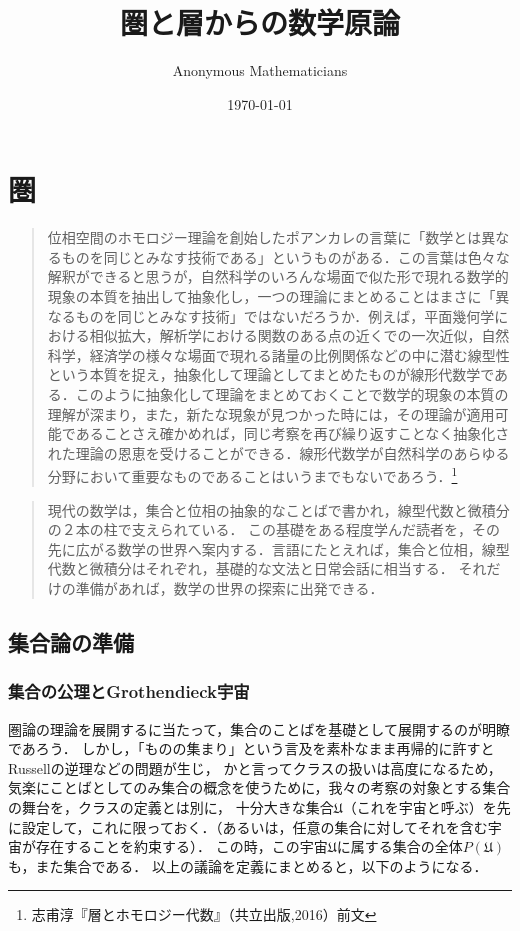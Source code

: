 \documentclass[uplatex, dvipdfmx]{jsreport}
\title{圏と層からの数学原論}
\author{Anonymous Mathematicians}
\date{\today}
\begin{document}
\maketitle
\tableofcontents
\clearpage

\part{圏}

\begin{quotation}
    位相空間のホモロジー理論を創始したポアンカレの言葉に「数学とは異なるものを同じとみなす技術である」というものがある．この言葉は色々な解釈ができると思うが，自然科学のいろんな場面で似た形で現れる数学的現象の本質を抽出して抽象化し，一つの理論にまとめることはまさに「異なるものを同じとみなす技術」ではないだろうか．例えば，平面幾何学における相似拡大，解析学における関数のある点の近くでの一次近似，自然科学，経済学の様々な場面で現れる諸量の比例関係などの中に潜む線型性という本質を捉え，抽象化して理論としてまとめたものが線形代数学である．このように抽象化して理論をまとめておくことで数学的現象の本質の理解が深まり，また，新たな現象が見つかった時には，その理論が適用可能であることさえ確かめれば，同じ考察を再び繰り返すことなく抽象化された理論の恩恵を受けることができる．線形代数学が自然科学のあらゆる分野において重要なものであることはいうまでもないであろう．\footnote{志甫淳『層とホモロジー代数』（共立出版,2016）前文}
\end{quotation}
\begin{quotation}
    現代の数学は，集合と位相の抽象的なことばで書かれ，線型代数と微積分の２本の柱で支えられている．
    この基礎をある程度学んだ読者を，その先に広がる数学の世界へ案内する．言語にたとえれば，集合と位相，線型代数と微積分はそれぞれ，基礎的な文法と日常会話に相当する．
    それだけの準備があれば，数学の世界の探索に出発できる．
\end{quotation}

\chapter{集合論の準備}\label{chapter-settheory}

\section{集合の公理とGrothendieck宇宙}

圏論の理論を展開するに当たって，集合のことばを基礎として展開するのが明瞭であろう．
しかし，「ものの集まり」という言及を素朴なまま再帰的に許すとRussellの逆理などの問題が生じ，
かと言ってクラスの扱いは高度になるため，
気楽にことばとしてのみ集合の概念を使うために，我々の考察の対象とする集合の舞台を，クラスの定義とは別に，
十分大きな集合$\mathfrak{U}$（これを宇宙と呼ぶ）を先に設定して，これに限っておく．（あるいは，任意の集合に対してそれを含む宇宙が存在することを約束する）．
この時，この宇宙$\mathfrak{U}$に属する集合の全体$P(\mathfrak{U})$も，また集合である．
以上の議論を定義にまとめると，以下のようになる．
\end{document}
